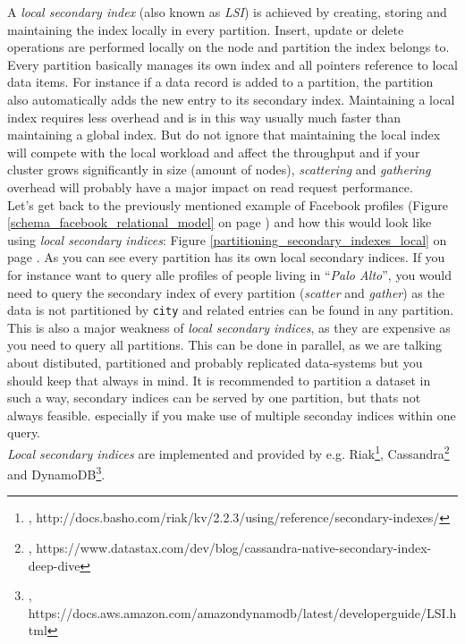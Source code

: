 {
\label{tf_dds_partitioning_secondary_indices_local_index}

A \textit{local secondary index} (also known as \textit{LSI}) is achieved by creating, storing and maintaining the index locally in every partition. Insert, update or delete operations are performed locally on the node and partition the index belongs to. Every partition basically manages its own index and all pointers reference to local data items. For instance if a data record is added to a partition, the partition also automatically adds the new entry to its secondary index. Maintaining a local index requires less overhead and is in this way usually much faster than maintaining a global index. But do not ignore that maintaining the local index will compete with the local workload and affect the throughput and if your cluster grows significantly in size (amount of nodes), \textit{scattering} and \textit{gathering} overhead will probably have a major impact on read request performance.\\
Let's get back to the previously mentioned example of Facebook profiles (Figure \ref{schema_facebook_relational_model} on page \pageref{schema_facebook_relational_model}) and how this would look like using \textit{local secondary indices}: Figure \ref{partitioning_secondary_indexes_local} on page \pageref{partitioning_secondary_indexes_local}. As you can see every partition has its own local secondary indices. If you for instance want to query alle profiles of people living in ``\textit{Palo Alto}'', you would need to query the secondary index of every partition (\textit{scatter} and \textit{gather}) as the data is not partitioned by \lstinline{city} and related entries can be found in any partition. This is also a major weakness of \textit{local secondary indices}, as they are expensive as you need to query all partitions. This can be done in parallel, as we are talking about distibuted, partitioned and probably replicated data-systems but you should keep that always in mind. It is recommended to partition a dataset in such a way, secondary indices can be served by one partition, but thats not always feasible. especially if you make use of multiple seconday indices within one query.\\
\textit{Local secondary indices} are implemented and provided by e.g. Riak\footnote{\cite{RIAKSIL}, http://docs.basho.com/riak/kv/2.2.3/using/reference/secondary-indexes/}, Cassandra\footnote{\cite{CASSIL}, https://www.datastax.com/dev/blog/cassandra-native-secondary-index-deep-dive} and DynamoDB\footnote{\cite{DYNDBSIL}, https://docs.aws.amazon.com/amazondynamodb/latest/developerguide/LSI.html}.

}
